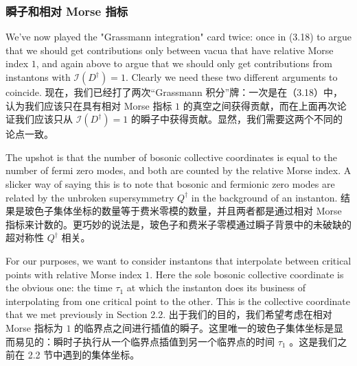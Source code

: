 \documentclass{article}
\begin{document}
\begin{paracol}{2}
\subsubsection*{瞬子和相对 Morse 指标}
\switchcolumn*

We've now played the "Grassmann integration" card twice: once in (3.18) to argue that we should get contributions only between vacua that have relative Morse index $1$, and again above to argue that we should only get contributions from instantons with $\mathcal{I}(D^{\dagger}) = 1$. Clearly we need these two different arguments to coincide.
\switchcolumn
现在，我们已经打了两次“Grassmann 积分”牌：一次是在（3.18）中，认为我们应该只在具有相对 Morse 指标 $1$ 的真空之间获得贡献，而在上面再次论证我们应该只从 $\mathcal{I}(D^{\dagger}) = 1$ 的瞬子中获得贡献。显然，我们需要这两个不同的论点一致。
\switchcolumn*

The upshot is that the number of bosonic collective coordinates is equal to the number of fermi zero modes, and both are counted by the relative Morse index. A slicker way of saying this is to note that bosonic and fermionic zero modes are related by the unbroken supersymmetry $Q^{\dagger}$ in the background of an instanton.
\switchcolumn
结果是玻色子集体坐标的数量等于费米零模的数量，并且两者都是通过相对 Morse 指标来计数的。更巧妙的说法是，玻色子和费米子零模通过瞬子背景中的未破缺的超对称性 $Q^{\dagger}$ 相关。
\switchcolumn*

For our purposes, we want to consider instantons that interpolate between critical points with relative Morse index $1$. Here the sole bosonic collective coordinate is the obvious one: the time $\tau_1$ at which the instanton does its business of interpolating from one critical point to the other. This is the collective coordinate that we met previously in Section 2.2.
\switchcolumn
出于我们的目的，我们希望考虑在相对 Morse 指标为 $1$ 的临界点之间进行插值的瞬子。这里唯一的玻色子集体坐标是显而易见的：瞬时子执行从一个临界点插值到另一个临界点的时间 $\tau_1$ 。这是我们之前在 2.2 节中遇到的集体坐标。
\switchcolumn*


\end{paracol}
\end{document}
